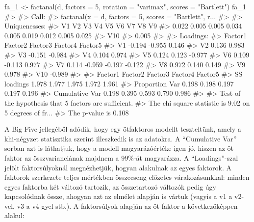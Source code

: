 \documentclass[
  letterpaper,
]{krantz}
\makeatletter
\newenvironment{Shaded}{\begin{snugshade}}{\end{snugshade}}
\newcommand{\AttributeTok}[1]{\textcolor[rgb]{0.40,0.45,0.13}{#1}}
\newcommand{\CommentTok}[1]{\textcolor[rgb]{0.37,0.37,0.37}{#1}}
\newcommand{\DecValTok}[1]{\textcolor[rgb]{0.68,0.00,0.00}{#1}}
\newcommand{\FunctionTok}[1]{\textcolor[rgb]{0.28,0.35,0.67}{#1}}
\newcommand{\NormalTok}[1]{\textcolor[rgb]{0.00,0.23,0.31}{#1}}
\newcommand{\OtherTok}[1]{\textcolor[rgb]{0.00,0.23,0.31}{#1}}
\newcommand{\StringTok}[1]{\textcolor[rgb]{0.13,0.47,0.30}{#1}}
\newenvironment{kframe}{%
\medskip{}
\setlength{\fboxsep}{.8em}
 \def\at@end@of@kframe{}%
 \ifinner\ifhmode%
  \def\at@end@of@kframe{\end{minipage}}%
  \begin{minipage}{\columnwidth}%
 \fi\fi%
 \def\FrameCommand##1{\hskip\@totalleftmargin \hskip-\fboxsep
 \colorbox{shadecolor}{##1}\hskip-\fboxsep
     \hskip-\linewidth \hskip-\@totalleftmargin \hskip\columnwidth}%
 \MakeFramed {\advance\hsize-\width
   \@totalleftmargin\z@ \linewidth\hsize
   \@setminipage}}%
 {\par\unskip\endMakeFramed%
 \at@end@of@kframe}
\renewenvironment{Shaded}{\begin{kframe}}{\end{kframe}}
\makeatother
\begin{document}
\begin{Shaded}
\begin{Highlighting}[]
\NormalTok{fa\_1 }\OtherTok{\textless{}{-}} \FunctionTok{factanal}\NormalTok{(d, }\AttributeTok{factors =} \DecValTok{5}\NormalTok{, }\AttributeTok{rotation =} \StringTok{"varimax"}\NormalTok{, }\AttributeTok{scores =} \StringTok{"Bartlett"}\NormalTok{)}
\NormalTok{fa\_1}
\CommentTok{\#\textgreater{} }
\CommentTok{\#\textgreater{} Call:}
\CommentTok{\#\textgreater{} factanal(x = d, factors = 5, scores = "Bartlett", r...}
\CommentTok{\#\textgreater{} }
\CommentTok{\#\textgreater{} Uniquenesses:}
\CommentTok{\#\textgreater{}    V1    V2    V3    V4    V5    V6    V7    V8    V9 }
\CommentTok{\#\textgreater{} 0.022 0.005 0.005 0.034 0.005 0.019 0.012 0.005 0.025 }
\CommentTok{\#\textgreater{}   V10 }
\CommentTok{\#\textgreater{} 0.005 }
\CommentTok{\#\textgreater{} }
\CommentTok{\#\textgreater{} Loadings:}
\CommentTok{\#\textgreater{}     Factor1 Factor2 Factor3 Factor4 Factor5}
\CommentTok{\#\textgreater{} V1          {-}0.194  {-}0.955   0.146         }
\CommentTok{\#\textgreater{} V2           0.136   0.983                 }
\CommentTok{\#\textgreater{} V3          {-}0.151                  {-}0.984 }
\CommentTok{\#\textgreater{} V4           0.104                   0.974 }
\CommentTok{\#\textgreater{} V5           0.124   0.123  {-}0.977         }
\CommentTok{\#\textgreater{} V6   0.109          {-}0.113   0.977         }
\CommentTok{\#\textgreater{} V7   0.114  {-}0.959  {-}0.197          {-}0.122 }
\CommentTok{\#\textgreater{} V8           0.972   0.140           0.149 }
\CommentTok{\#\textgreater{} V9   0.978                                 }
\CommentTok{\#\textgreater{} V10 {-}0.989                                 }
\CommentTok{\#\textgreater{} }
\CommentTok{\#\textgreater{}                Factor1 Factor2 Factor3 Factor4 Factor5}
\CommentTok{\#\textgreater{} SS loadings      1.978   1.977   1.975   1.972   1.961}
\CommentTok{\#\textgreater{} Proportion Var   0.198   0.198   0.197   0.197   0.196}
\CommentTok{\#\textgreater{} Cumulative Var   0.198   0.395   0.593   0.790   0.986}
\CommentTok{\#\textgreater{} }
\CommentTok{\#\textgreater{} Test of the hypothesis that 5 factors are sufficient.}
\CommentTok{\#\textgreater{} The chi square statistic is 9.02 on 5 degrees of fr...}
\CommentTok{\#\textgreater{} The p{-}value is 0.108}
\end{Highlighting}
\end{Shaded}

A Big Five jellegéből adódik, hogy egy ötfaktoros modellt teszteltünk,
amely a khi-négyzet statisztika szerint illeszkedik is az adatokra. A
``Cumulative Var'' sorban azt is láthatjuk, hogy a modell
magyarázóértéke igen jó, hiszen az öt faktor az összvarianciának majdnem
a 99\%-át magyarázza. A ``Loadings''-szal jelölt faktorsúlyoknál
megnézhetjük, hogyan alakulnak az egyes faktorok. A faktorok szerkezete
teljes mértékben összecseng előzetes várakozásunkkal: minden egyes
faktorba két változó tartozik, az összetartozó változók pedig úgy
kapcsolódnak össze, ahogyan azt az elmélet alapján is vártuk (vagyis a
v1 a v2-vel, v3 a v4-gyel stb.). A faktorsúlyok alapján az öt faktor a
következőképpen alakul:
\end{document}
